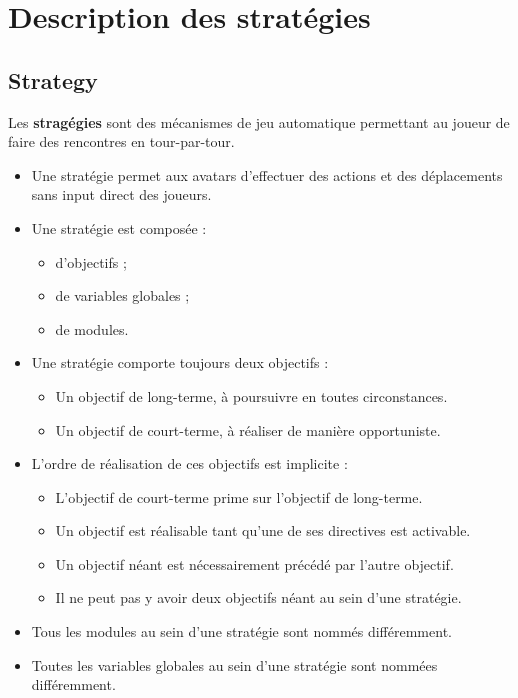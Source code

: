 \section{Description des stratégies}

\subsection{Strategy}
Les \textbf{stragégies} sont des mécanismes de jeu automatique permettant au joueur de faire des rencontres en tour-par-tour.
    \begin{itemize}
        \item Une stratégie permet aux avatars d'effectuer des actions et des déplacements sans input direct des joueurs.
        \item Une stratégie est composée :
            \begin{itemize}
                \item d'objectifs ;
                \item de variables globales ;
                \item de modules.
            \end{itemize}
        \item Une stratégie comporte toujours deux objectifs :
            \begin{itemize}
                \item Un objectif de long-terme, à poursuivre en toutes circonstances.
                \item Un objectif de court-terme, à réaliser de manière opportuniste.
            \end{itemize}
        \item L'ordre de réalisation de ces objectifs est implicite :
        \begin{itemize}
            \item L'objectif de court-terme prime sur l'objectif de long-terme.
            \item Un objectif est réalisable tant qu'une de ses directives est activable.
            \item Un objectif néant est nécessairement précédé par l'autre objectif.
            \item Il ne peut pas y avoir deux objectifs néant au sein d'une stratégie.
        \end{itemize}
        \item Tous les modules au sein d'une stratégie sont nommés différemment.
        \item Toutes les variables globales au sein d'une stratégie sont nommées différemment.
    \end{itemize}

